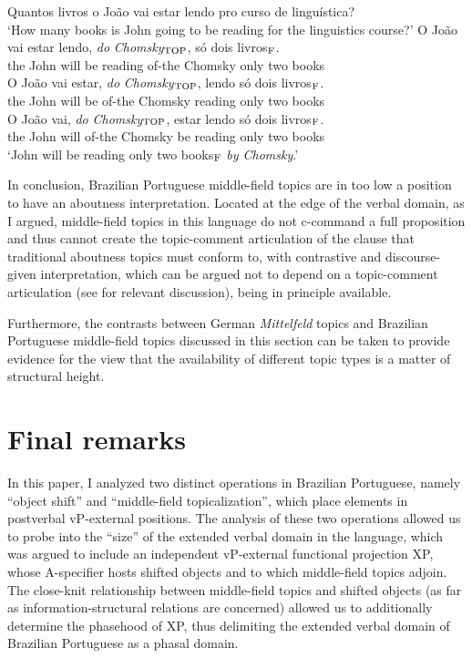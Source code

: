 \documentclass[output=paper]{langscibook}
\begin{document}
\begin{exe}
\ex \label{lacerda41}
\begin{xlist}\sloppy
{} \label{lacerda41A}
Quantos livros o João vai estar lendo pro curso de linguística?\\
‘How many books is John going to be reading for the linguistics course?’
 \label{lacerda41B1}
\gll O 	João 	vai 	estar 	lendo, 	\emph{do} 	\emph{Chomsky}$_{\textnormal{TOP}}$, 	só 	dois 	livros$_{\textnormal{F}}$.\\
the 	John 	will 	be 	reading 	of-the 	Chomsky 	only 	two 	books\\
 \label{lacerda41B2}
\gll * O 	João 	vai 	estar, 	\emph{do} 	\emph{Chomsky}$_{\textnormal{TOP}}$, 	lendo 	só 	dois 	livros$_{\textnormal{F}}$.\\
{} the 	John 	will 	be 	of-the 	Chomsky 	reading 	only 	two 	books\\
 \label{lacerda41B3}
\gll * O 	João 	vai, 	\emph{do} 	\emph{Chomsky}$_{\textnormal{TOP}}$, 	estar 	lendo 	só 	dois 	livros$_{\textnormal{F}}$.\\
{} the 	John 	will 	of-the 	Chomsky 	be 	reading 	only 	two 	books\\
\glt‘John will be reading only two books$_{\textnormal{F}}$ \emph{by Chomsky}.’
\end{xlist}


\end{exe}

In conclusion, Brazilian Portuguese middle-field topics are in too low a position to have an aboutness interpretation. Located at the edge of the verbal domain, as I argued, middle-field topics in this language do not c-command a full proposition and thus cannot create the topic-comment articulation of the clause that traditional aboutness topics must conform to, with contrastive and discourse-given interpretation, which can be argued not to depend on a topic-comment articulation (see \citealt{Lacerda2020b} for relevant discussion), being in principle available.

Furthermore, the contrasts between German \emph{Mittelfeld} topics and Brazilian Portuguese middle-field topics discussed in this section can be taken to provide evidence for the view that the availability of different topic types is a matter of structural height.

\section{Final remarks}
In this paper, I analyzed two distinct operations in Brazilian Portuguese, namely “object shift” and “middle-field topicalization”, which place elements in postverbal vP-external positions. The analysis of these two operations allowed us to probe into the “size” of the extended verbal domain in the language, which was argued to include an independent vP-external functional projection XP, whose A-specifier hosts shifted objects and to which middle-field topics adjoin. The close-knit relationship between middle-field topics and shifted objects (as far as information-structural relations are concerned) allowed us to additionally determine the phasehood of XP, thus delimiting the extended verbal domain of Brazilian Portuguese as a phasal domain.
\end{document}
